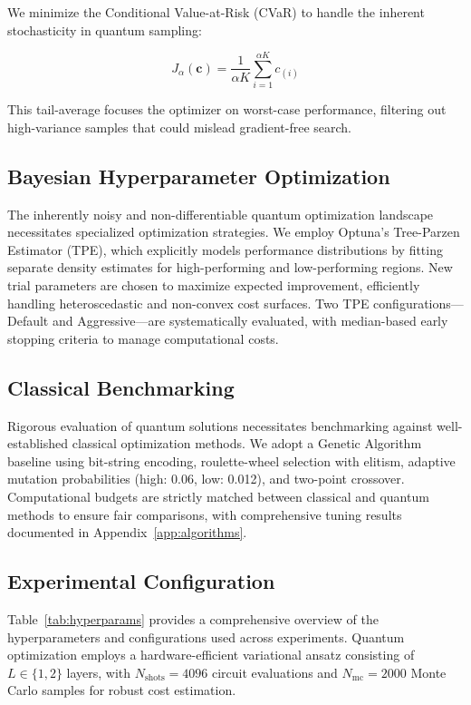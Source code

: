 We minimize the Conditional Value-at-Risk (CVaR) to handle the inherent stochasticity in quantum sampling:

\begin{equation}
J_{\alpha}(\mathbf{c}) = \frac{1}{\alpha K}\sum_{i=1}^{\alpha K} c_{(i)}
\label{eq:cvar}
\end{equation}

This tail-average focuses the optimizer on worst-case performance, filtering out high-variance samples that could mislead gradient-free search.

\subsection{Bayesian Hyperparameter Optimization}

The inherently noisy and non-differentiable quantum optimization landscape necessitates specialized optimization strategies. We employ Optuna's Tree-Parzen Estimator (TPE), which explicitly models performance distributions by fitting separate density estimates for high-performing and low-performing regions. New trial parameters are chosen to maximize expected improvement, efficiently handling heteroscedastic and non-convex cost surfaces. Two TPE configurations---Default and Aggressive---are systematically evaluated, with median-based early stopping criteria to manage computational costs.

\subsection{Classical Benchmarking}

Rigorous evaluation of quantum solutions necessitates benchmarking against well-established classical optimization methods. We adopt a Genetic Algorithm baseline using bit-string encoding, roulette-wheel selection with elitism, adaptive mutation probabilities (high: 0.06, low: 0.012), and two-point crossover. Computational budgets are strictly matched between classical and quantum methods to ensure fair comparisons, with comprehensive tuning results documented in Appendix~\ref{app:algorithms}.

\subsection{Experimental Configuration}

Table~\ref{tab:hyperparams} provides a comprehensive overview of the hyperparameters and configurations used across experiments. Quantum optimization employs a hardware-efficient variational ansatz consisting of $L \in \{1,2\}$ layers, with $N_{\text{shots}}=4096$ circuit evaluations and $N_{\text{mc}}=2000$ Monte Carlo samples for robust cost estimation.

